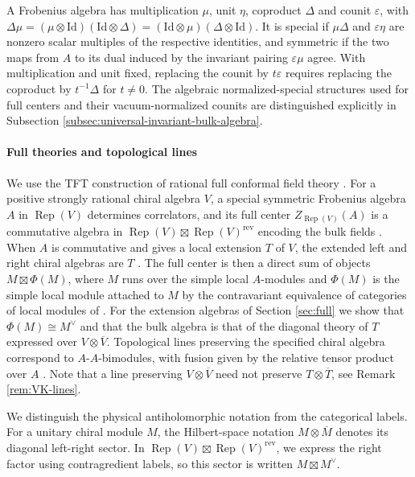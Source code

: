 \documentclass[leqno]{article}
\newcommand{\Id}{\mathrm{Id}}
\newcommand{\ot}{\otimes}
\newcommand{\epsi}{\varepsilon}
\DeclareMathOperator{\Rep}{Rep}
\numberwithin{equation}{section}
\begin{document}
A Frobenius algebra has multiplication $\mu$, unit $\eta$, coproduct $\Delta$ and counit $\epsi$, with $\Delta\mu = (\mu\ot\Id)(\Id\ot\Delta) = (\Id\ot\mu)(\Delta\ot\Id)$. It is special if $\mu\Delta$ and $\epsi\eta$ are nonzero scalar multiples of the respective identities, and symmetric if the two maps from $A$ to its dual induced by the invariant pairing $\epsi\mu$ agree. With multiplication and unit fixed, replacing the counit by $t\epsi$ requires replacing the coproduct by $t^{-1}\Delta$ for $t \neq 0$. The algebraic normalized-special structures used for full centers and their vacuum-normalized counits are distinguished explicitly in Subsection \ref{subsec:universal-invariant-bulk-algebra}.

\paragraph{Full theories and topological lines}
We use the TFT construction of rational full conformal field theory \cite{FRS02}. For a positive strongly rational chiral algebra $V$, a special symmetric Frobenius algebra $A$ in $\Rep(V)$ determines correlators, and its full center $Z_{\Rep(V)}(A)$ is a commutative algebra in $\Rep(V)\boxtimes\Rep(V)^{\mathrm{rev}}$ encoding the bulk fields \cite{KoR08}. When $A$ is commutative and gives a local extension $T$ of $V$, the extended left and right chiral algebras are $T$ \cite[Section 5.5]{FRS02}. The full center is then a direct sum of objects $M\boxtimes\Phi(M)$, where $M$ runs over the simple local $A$-modules and $\Phi(M)$ is the simple local module attached to $M$ by the contravariant equivalence of categories of local modules of \cite[Theorem 2.5.1 p.~1328]{Dav10}. For the extension algebras of Section \ref{sec:full} we show that $\Phi(M) \cong M^\vee$ and that the bulk algebra is that of the diagonal theory of $T$ expressed over $V\ot\overline V$. Topological lines preserving the specified chiral algebra correspond to $A$-$A$-bimodules, with fusion given by the relative tensor product over $A$ \cite{FFRS07}. Note that a line preserving $V\ot\overline V$ need not preserve $T\ot\overline T$, see Remark \ref{rem:VK-lines}.

We distinguish the physical antiholomorphic notation from the categorical labels. For a unitary chiral module $M$, the Hilbert-space notation $M\ot\overline M$ denotes its diagonal left-right sector. In $\Rep(V)\boxtimes\Rep(V)^{\mathrm{rev}}$, we express the right factor using contragredient labels, so this sector is written $M\boxtimes M^\vee$.
\end{document}
